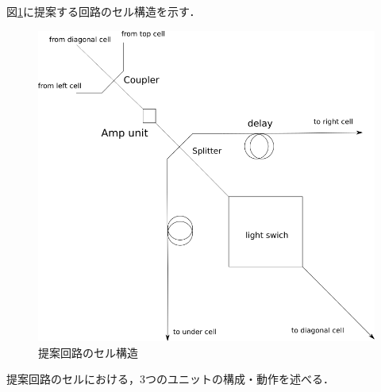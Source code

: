 図\ref{fig:proposalcell}に提案する回路のセル構造を示す．
\begin{figure}[t!]
\begin{center}
\includegraphics[keepaspectratio,scale=0.5]{fig/3/lightracelogic_cell_6.png}
\caption{提案回路のセル構造}
\label{fig:proposalcell}
\end{center}
\end{figure}
提案回路のセルにおける，3つのユニットの構成・動作を述べる．
